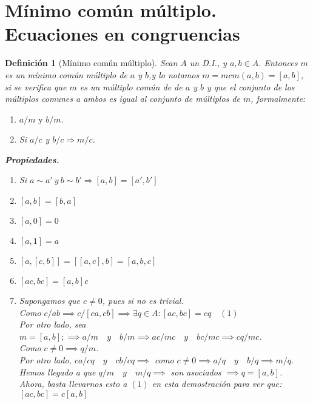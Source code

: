 \documentclass[11pt, a4paper, titlepage]{article}
\makeatletter
\newif\IfInSansMode
\let\oldsf\sffamily
\renewcommand*{\sffamily}{\oldsf\mathversion{sans}\InSansModetrue}
\let\oldnorm\normalfont
\renewcommand*{\normalfont}{\oldnorm\InSansModefalse\mathversion{normal}}
\renewenvironment{proof}[1][\proofname] {\vspace{-15pt}\par\pushQED{\qed}\normalfont\topsep6\p@\@plus6\p@\relax\trivlist\item[\hskip\labelsep\it#1\@addpunct{.}]\ignorespaces}{\popQED\endtrivlist\@endpefalse}
\renewenvironment{proof}[1][\proofname] {\par\pushQED{\qed}\normalfont\topsep6\p@\@plus6\p@\relax\trivlist\item[\hskip\labelsep\itshape\sffamily#1\@addpunct{.}]\ignorespaces}{\popQED\endtrivlist\@endpefalse}
\theoremstyle{theorem-style}
\theoremstyle{definition-style}
\newtheorem{ndef}{Definición}[section]
\theoremstyle{remark-style}
\theoremstyle{example-style}
\newenvironment{nlist}
{\begin{enumerate}
\renewcommand\labelenumi{(\emph{\roman{enumi})}}}
{\end{enumerate}}
\makeatother
\begin{document}
\section{Mínimo común múltiplo. Ecuaciones en congruencias}
\begin{ndef}[Mínimo común múltiplo]
	Sean $A$ un D.I., y $a, b \in A$. Entonces $m$ es un mínimo común múltiplo de $a$ y $b$,y lo notamos $m = mcm(a,b) = [a,b]$,
si se verifica que $m$ es un múltiplo común de de $a$ y $b$ y que el conjunto de los múltiplos comunes a ambos es igual al conjunto de múltiplos de $m$, formalmente:
\begin{enumerate}
\item $a/m \text{ y } b/m$.
\item Si $a/c$ y $b/c \Rightarrow m/c$.
\end{enumerate}

\textbf{Propiedades. }
\begin{nlist}
\item Si $a\sim a' \ y \ b\sim b' \Rightarrow [a,b]=[a',b']$
\item $[a,b] = [b,a]$
\item $[a,0] = 0$
\item $[a,1] = a$
\item $[a,[c,b]]= [[a,c],b] = [a,b,c]$
\item $[ac,bc] =[a,b]c$\\

\begin{proof}[Demostración del último.]

	Supongamos que $c\ne 0$, pues si no es trivial.\\
	Como $c/ab\implies c/[ca,cb] \implies \exists q \in A : [ac,bc] = cq\quad (1)$\\
	Por otro lado, sea $m = [a,b]; \implies a/m \quad y \quad b/m \implies ac/mc \quad y \quad bc/mc \implies cq/mc$.\\
	Como $c\ne 0 \implies q/m$.\\
	Por otro lado, $ca/cq \quad y \quad cb/cq \implies$ como $c\ne 0 \implies a/q \quad y \quad b/q \implies m/q.$\\
	Hemos llegado a que $q/m \quad y \quad m/q \implies $ son asociados $\implies q=[a,b]$.\\
	Ahora, basta llevarnos esto a $(1)$ en esta demostración para ver que:\\ $[ac,bc] = c[a,b]$
\end{proof}
\end{nlist}
\end{ndef}
\end{document}
